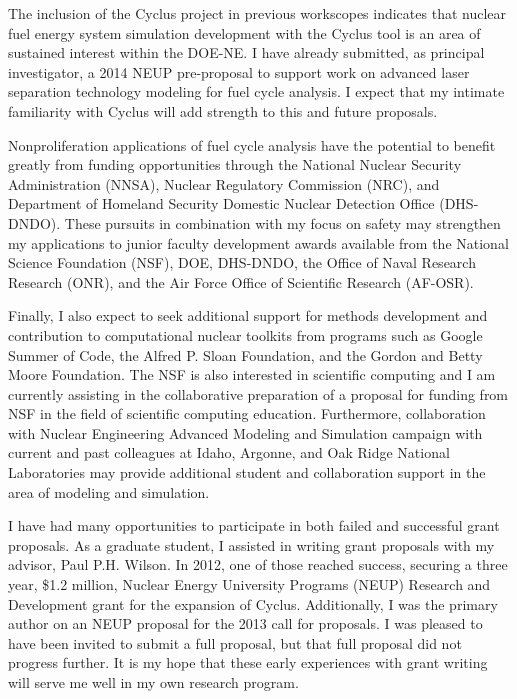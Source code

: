 \documentclass[a4paper, 10pt]{article}
\begin{document}
The inclusion of the Cyclus project in previous workscopes indicates that 
nuclear fuel energy system simulation development with the Cyclus tool is an 
area of sustained interest within the DOE-NE.  I have already submitted, as 
principal investigator, a 2014 NEUP pre-proposal to support work on advanced 
laser separation technology modeling for fuel cycle analysis.  I expect that my 
intimate familiarity with Cyclus will add strength to this and future proposals.  

Nonproliferation applications of fuel cycle analysis have the potential to benefit greatly from funding 
opportunities through the National Nuclear Security Administration (NNSA), 
Nuclear Regulatory Commission (NRC), and Department of Homeland Security 
Domestic Nuclear Detection Office (DHS-DNDO). These pursuits in combination with 
my focus on safety may  strengthen my applications to junior faculty development 
awards available from the National Science Foundation (NSF), DOE, DHS-DNDO, the 
Office of Naval Research Research (ONR), and the Air Force Office of Scientific 
Research (AF-OSR).

Finally, I also expect to seek additional support for methods development and 
contribution to computational nuclear toolkits from programs such as Google 
Summer of Code, the Alfred P. Sloan Foundation, and the Gordon and Betty Moore 
Foundation.  The NSF is also interested in 
scientific computing and I am currently assisting in the collaborative preparation 
of a proposal for funding from NSF in the field of scientific computing 
education. Furthermore, collaboration with Nuclear Engineering Advanced 
Modeling and Simulation campaign with current and past colleagues at Idaho, 
Argonne, and Oak Ridge National Laboratories may provide additional student and 
collaboration support in the area of modeling and simulation. 

I have had many opportunities to participate in both failed and successful grant 
proposals.  As a graduate student, I assisted in writing grant proposals with my 
advisor, Paul P.H. Wilson. In 2012, one of those reached success, securing a 
three year, \$1.2 million, Nuclear Energy University Programs (NEUP) Research 
and Development grant for the expansion of Cyclus. Additionally, I was the 
primary author on an NEUP proposal for the 2013 call for proposals. I was 
pleased to have been invited to submit a full proposal, but that full proposal 
did not progress further. It is my hope that these early experiences with grant 
writing will serve me well in my own research program.






\end{document}
